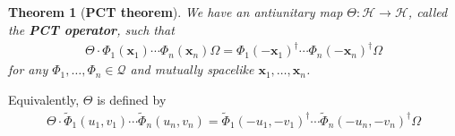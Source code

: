 \documentclass[12pt,b5paper,notitlepage]{article}
\theoremstyle{definition}
\theoremstyle{plain}
\newtheorem{thm}[df]{Theorem}
\newcommand{\mc}{\mathcal}
\newcommand{\wtd}{\widetilde}
\newcommand{\scr}{\mathscr}
\newcommand{\xbf}{\mathbf x}
\numberwithin{equation}{section}
\begin{document}
\subsection{}




\begin{thm}[\textbf{PCT theorem}]\label{lb10}
We have an antiunitary map $\Theta:\mc H\rightarrow\mc H$, called the \textbf{PCT operator},  such that
\begin{align}
\Theta\cdot \Phi_1(\xbf_1)\cdots\Phi_n(\xbf_n)\Omega=\Phi_1(-\xbf_1)^\dagger\cdots\Phi_n(-\xbf_n)^\dagger\Omega
\end{align}
for any $\Phi_1,\dots,\Phi_n\in\scr Q$ and mutually spacelike $\xbf_1,\dots,\xbf_n$.
\end{thm}


Equivalently, $\Theta$ is defined by
\begin{align}\label{eq13}
\Theta\cdot\wtd\Phi_1(u_1,v_1)\cdots\wtd\Phi_n(u_n,v_n)=\wtd\Phi_1(-u_1,-v_1)^\dagger\cdots \wtd\Phi_n(-u_n,-v_n)^\dagger\Omega
\end{align}
\end{document}

